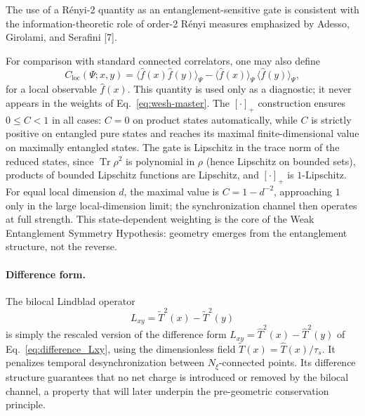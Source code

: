 \documentclass[12pt,a4paper]{article}
\renewcommand{\Tr}{\operatorname{Tr}}
\numberwithin{equation}{section}
\begin{document}
\vspace{0.3cm}
\noindent The use of a R\'enyi-2 quantity as an entanglement-sensitive gate is consistent with the information-theoretic role of order-2 R\'enyi measures emphasized by Adesso, Girolami, and Serafini [7].

\vspace{0.3cm}
\noindent For comparison with standard connected correlators, one may also define
\begin{equation}
C_{\text{loc}}(\Psi;x,y)
= \langle \hat{f}(x)\hat{f}(y)\rangle_\Psi
 - \langle \hat{f}(x)\rangle_\Psi\,\langle \hat{f}(y)\rangle_\Psi,
\label{eq:local-correlator}
\end{equation}
for a local observable $\hat f(x)$. This quantity is used only as a
diagnostic; it never appears in the weights of
Eq.~\eqref{eq:wesh-master}. The $[\cdot]_+$ construction ensures $0\leq C<1$ in all cases:
$C=0$ on product states automatically, while $C$ is strictly positive on
entangled pure states and reaches its maximal finite-dimensional value on
maximally entangled states. The gate is Lipschitz in the trace norm of the
reduced states, since $\Tr\rho^2$ is polynomial in $\rho$ (hence Lipschitz
on bounded sets), products of bounded Lipschitz functions are Lipschitz,
and $[\cdot]_+$ is $1$-Lipschitz. For equal local dimension $d$, the
maximal value is $C=1-d^{-2}$, approaching $1$ only in the large
local-dimension limit; the synchronization channel then operates at full
strength. This state-dependent weighting is the core of the Weak
Entanglement Symmetry Hypothesis: geometry emerges from the entanglement
structure, not the reverse.

\paragraph{Difference form.}
The bilocal Lindblad operator
\begin{equation}
L_{xy} = \tilde{T}^2(x) - \tilde{T}^2(y)
\label{eq:Lxy-rescaled}
\end{equation}
is simply the rescaled version of the difference form
$L_{xy} = \hat{T}^2(x) - \hat{T}^2(y)$ of Eq.~\eqref{eq:difference_Lxy},
using the dimensionless field $\tilde{T}(x)=\hat{T}(x)/\tau_s$.
It penalizes temporal desynchronization between $N_\xi$-connected points. Its difference structure guarantees that no net charge is introduced or removed by the bilocal channel, 
a property that will later underpin the pre-geometric conservation principle.
\end{document}
